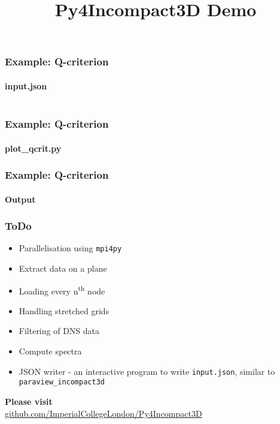 \documentclass{beamer}
\title{Py4Incompact3D Demo}
\begin{document}
\maketitle

\begin{frame}
  \frametitle{Example: Q-criterion}
  \framesubtitle{input.json}

  \begin{columns}
    \begin{column}{0.49\textwidth}
      
    \end{column}
    \begin{column}{0.49\textwidth}
      
    \end{column}
  \end{columns}
\end{frame}
\begin{frame}
  \frametitle{Example: Q-criterion}
  \framesubtitle{plot\_qcrit.py}

  \centering
  
  
\end{frame}
\begin{frame}
  \frametitle{Example: Q-criterion}
  \framesubtitle{Output}
  
\end{frame}

\begin{frame}
  \frametitle{ToDo}

  \centering

  \begin{itemize}
  \item Parallelisation using \texttt{mpi4py}
  \item Extract data on a plane
  \item Loading every n\textsuperscript{th} node
  \item Handling stretched grids
  \item Filtering of DNS data
  \item Compute spectra
  \item JSON writer - an interactive program to write \texttt{input.json}, similar to
    \texttt{paraview\_incompact3d}
  \end{itemize}
  
  \textbf{Please visit}\\
  \url{github.com/ImperialCollegeLondon/Py4Incompact3D}
\end{frame}
\end{document}
